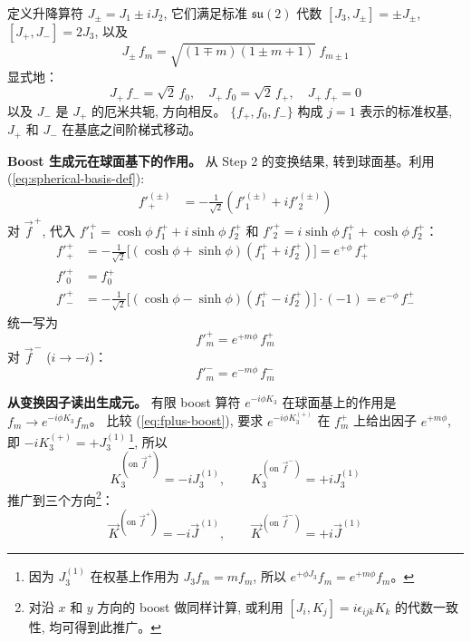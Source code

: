 定义升降算符 $J_\pm = J_1 \pm iJ_2$, 它们满足标准 $\mathfrak{su}(2)$ 代数
$[J_3, J_\pm] = \pm J_\pm$, $[J_+, J_-] = 2J_3$, 以及
\begin{equation}
    J_\pm\,f_m = \sqrt{(1\mp m)(1\pm m+1)}\;f_{m\pm 1}
    \label{eq:J-pm-action}
\end{equation}
显式地：
\begin{equation}
    J_+\,f_- = \sqrt{2}\,f_0, \quad J_+\,f_0 = \sqrt{2}\,f_+, \quad J_+\,f_+ = 0
\end{equation}
以及 $J_-$ 是 $J_+$ 的厄米共轭, 方向相反。
$\{f_+, f_0, f_-\}$ 构成 $j=1$ 表示的标准权基, $J_+$ 和 $J_-$ 在基底之间阶梯式移动。

\textbf{Boost 生成元在球面基下的作用。}
从 Step 2 的变换结果, 转到球面基。利用 (\ref{eq:spherical-basis-def}):
\begin{align}
    f'^{(\pm)}_+ &= -\frac{1}{\sqrt{2}}(f'^{(\pm)}_1 + if'^{(\pm)}_2)
\end{align}
对 $\vec{f}^{\,+}$, 代入 $f'^+_1 = \cosh\phi\,f^+_1 + i\sinh\phi\,f^+_2$
和 $f'^+_2 = i\sinh\phi\,f^+_1 + \cosh\phi\,f^+_2$：
\begin{align}
    f'^+_+ &= -\frac{1}{\sqrt{2}}\bigl[(\cosh\phi + \sinh\phi)(f^+_1 + if^+_2)\bigr]
    = e^{+\phi}\,f^+_+ \\
    f'^+_0 &= f^+_0 \\
    f'^+_- &= -\frac{1}{\sqrt{2}}\bigl[(\cosh\phi - \sinh\phi)(f^+_1 - if^+_2)\bigr] \cdot(-1)
    = e^{-\phi}\,f^+_-
\end{align}
统一写为
\begin{equation}
    f'^+_m = e^{+m\phi}\,f^+_m
    \label{eq:fplus-boost}
\end{equation}
对 $\vec{f}^{\,-}$ ($i\to -i$)：
\begin{equation}
    f'^-_m = e^{-m\phi}\,f^-_m
    \label{eq:fminus-boost}
\end{equation}

\textbf{从变换因子读出生成元。}
有限 boost 算符 $e^{-i\phi K_3}$ 在球面基上的作用是 $f_m \to e^{-i\phi K_3}f_m$。
比较 (\ref{eq:fplus-boost}), 要求 $e^{-i\phi K_3^{(+)}}$ 在 $f^+_m$ 上给出因子 $e^{+m\phi}$,
即 $-iK_3^{(+)} = +J_3^{(1)}$\,\footnote{%
因为 $J_3^{(1)}$ 在权基上作用为 $J_3 f_m = mf_m$,
所以 $e^{+\phi J_3}f_m = e^{+m\phi}f_m$。}, 所以
\begin{equation}
    K_3^{(\text{on }\vec{f}^+)} = -iJ_3^{(1)}, \qquad
    K_3^{(\text{on }\vec{f}^-)} = +iJ_3^{(1)}
\end{equation}
推广到三个方向\footnote{%
对沿 $x$ 和 $y$ 方向的 boost 做同样计算, 或利用 $[J_i, K_j]=i\epsilon_{ijk}K_k$
的代数一致性, 均可得到此推广。}：
\begin{equation}
    \vec{K}^{(\text{on }\vec{f}^+)} = -i\vec{J}^{(1)}, \qquad
    \vec{K}^{(\text{on }\vec{f}^-)} = +i\vec{J}^{(1)}
    \label{eq:K-on-fpm}
\end{equation}

